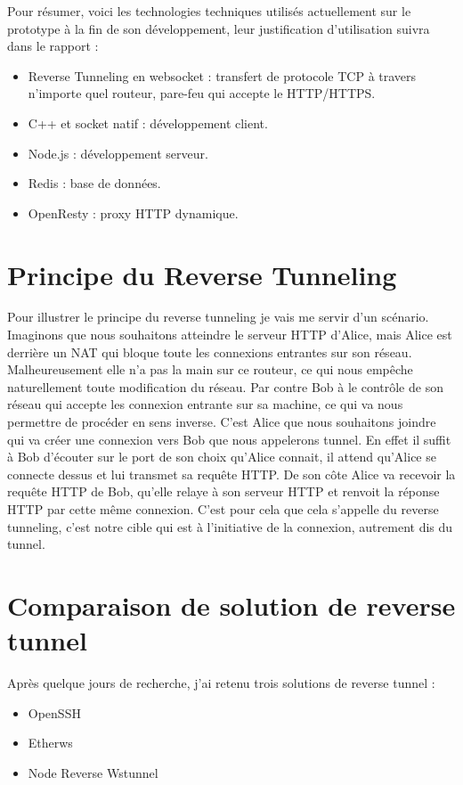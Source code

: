 Pour résumer, voici les technologies techniques utilisés actuellement sur le prototype à la fin de son développement, leur justification d'utilisation suivra dans le rapport :

\begin{itemize}
    \item Reverse Tunneling en websocket : transfert de protocole TCP à travers n'importe quel routeur, pare-feu qui accepte le HTTP/HTTPS.
    \item C++ et socket natif : développement client.
    \item Node.js : développement serveur.
    \item Redis : base de données.
    \item OpenResty : proxy HTTP dynamique.
\end{itemize}

\section{Principe du Reverse Tunneling}

Pour illustrer le principe du reverse tunneling je vais me servir d'un scénario. Imaginons que nous souhaitons atteindre le serveur HTTP d'Alice, mais Alice est derrière un NAT qui bloque toute les connexions entrantes sur son réseau. Malheureusement elle n'a pas la main sur ce routeur, ce qui nous empêche naturellement toute modification du réseau. Par contre Bob à le contrôle de son réseau qui accepte les connexion entrante sur sa machine, ce qui va nous permettre de procéder en sens inverse. C'est Alice que nous souhaitons joindre qui va créer une connexion vers Bob que nous appelerons tunnel. En effet il suffit à Bob d'écouter sur le port de son choix qu'Alice connait, il attend qu'Alice se connecte dessus et lui transmet sa requête HTTP. De son côte Alice va recevoir la requête HTTP de Bob, qu'elle relaye à son serveur HTTP et renvoit la réponse HTTP par cette même connexion. C'est pour cela que cela s'appelle du reverse tunneling, c'est notre cible qui est à l'initiative de la connexion, autrement dis du tunnel.

\section{Comparaison de solution de reverse tunnel}

Après quelque jours de recherche, j'ai retenu trois solutions de reverse tunnel :

\begin{itemize}
    \item OpenSSH
    \item Etherws
    \item Node Reverse Wstunnel
\end{itemize}

